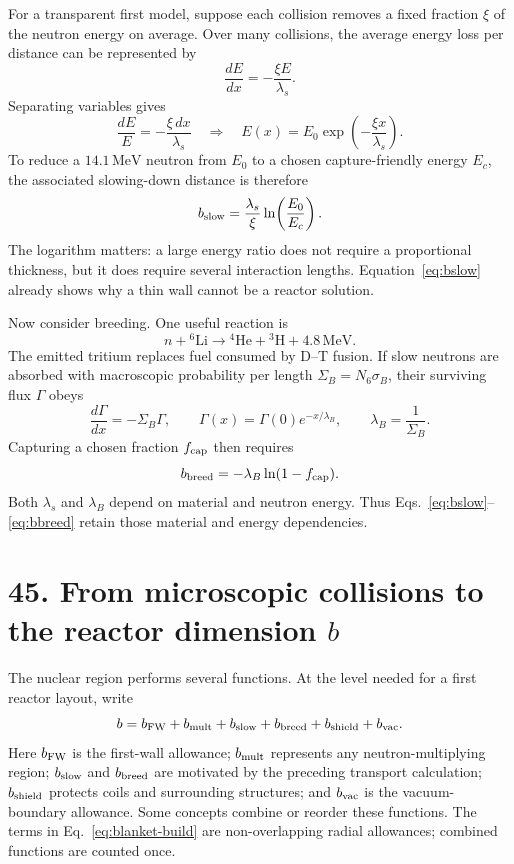 \documentclass[11pt]{article}
\begin{document}
For a transparent first model, suppose each collision removes a fixed fraction $\xi$
of the neutron energy on average. Over many collisions, the average energy loss per
distance can be represented by
\begin{equation}
 \frac{dE}{dx}=-\frac{\xi E}{\lambda_s}.
 \label{eq:slowing-down}
\end{equation}
Separating variables gives
\[
 \frac{dE}{E}=-\frac{\xi\,dx}{\lambda_s}
 \quad\Longrightarrow\quad
 E(x)=E_0\exp\!\left(-\frac{\xi x}{\lambda_s}\right).
\]
To reduce a $14.1\,\mathrm{MeV}$ neutron from $E_0$ to a chosen capture-friendly
energy $E_c$, the associated slowing-down distance is therefore
\begin{equation}
 b_{\rm slow}=\frac{\lambda_s}{\xi}\ln\!\left(\frac{E_0}{E_c}\right).
 \label{eq:bslow}
\end{equation}
The logarithm matters: a large energy ratio does not require a proportional thickness,
but it does require several interaction lengths. Equation~\eqref{eq:bslow} already
shows why a thin wall cannot be a reactor solution.

Now consider breeding. One useful reaction is
\[
 n+{}^6\mathrm{Li}\longrightarrow{}^4\mathrm{He}+{}^3\mathrm{H}
 +4.8\,\mathrm{MeV}.
\]
The emitted tritium replaces fuel consumed by D--T fusion. If slow neutrons are
absorbed with macroscopic probability per length $\Sigma_B=N_6\sigma_B$, their
surviving flux $\Gamma$ obeys
\[
 \frac{d\Gamma}{dx}=-\Sigma_B\Gamma,
 \qquad
 \Gamma(x)=\Gamma(0)e^{-x/\lambda_B},
 \qquad
 \lambda_B=\frac1{\Sigma_B}.
\]
Capturing a chosen fraction $f_{\rm cap}$ then requires
\begin{equation}
 b_{\rm breed}=-\lambda_B\ln(1-f_{\rm cap}).
 \label{eq:bbreed}
\end{equation}
Both $\lambda_s$ and $\lambda_B$ depend on material and neutron energy. Thus
Eqs.~\eqref{eq:bslow}--\eqref{eq:bbreed} retain those material and energy dependencies.

\section*{45. From microscopic collisions to the reactor dimension $b$}

The nuclear region performs several functions. At the level
needed for a first reactor layout, write
\begin{equation}
 b=b_{\rm FW}+b_{\rm mult}+b_{\rm slow}+b_{\rm breed}
   +b_{\rm shield}+b_{\rm vac}.
 \label{eq:blanket-build}
\end{equation}
Here $b_{\rm FW}$ is the first-wall allowance; $b_{\rm mult}$ represents any
neutron-multiplying region; $b_{\rm slow}$ and $b_{\rm breed}$ are motivated by the
preceding transport calculation; $b_{\rm shield}$ protects coils and surrounding
structures; and $b_{\rm vac}$ is the vacuum-boundary allowance. Some concepts combine
or reorder these functions. The terms in Eq.~\eqref{eq:blanket-build} are non-overlapping radial allowances;
combined functions are counted once.
\end{document}
